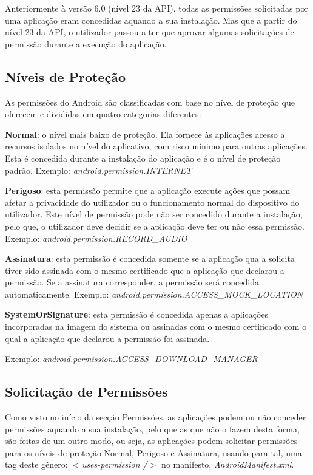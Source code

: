 Anteriormente à versão 6.0 (nível 23 da API), todas as permissões solicitadas por uma aplicação eram concedidas aquando a sua instalação. Mas que a partir do nível 23 da API, o utilizador passou a ter que aprovar algumas solicitações de permissão durante a execução do aplicação.


\subsection{Níveis de Proteção}
As permissões do Android são classificadas com base no nível de proteção que oferecem e divididas em quatro categorias diferentes:

\textbf{Normal}: o nível mais baixo de proteção. Ela fornece às aplicações acesso a recursos isolados no nível do aplicativo, com risco mínimo para outras aplicações. Esta é concedida durante a instalação do aplicação e é o nível de proteção padrão.
Exemplo: \textit{android.permission.INTERNET}

\textbf{Perigoso}: esta permissão permite que a aplicação execute ações que possam afetar a privacidade do utilizador ou o funcionamento normal do dispositivo do utilizador. Este nível de permissão pode não ser concedido durante a instalação, pelo que, o utilizador deve decidir se a aplicação deve ter ou não essa permissão.
Exemplo: \textit{android.permission.RECORD\_AUDIO}

\textbf{Assinatura}: esta permissão é concedida somente se a aplicação qua a solicita tiver sido assinada com o mesmo certificado que a aplicação que declarou a permissão. Se a assinatura corresponder, a permissão será concedida automaticamente.
Exemplo: \textit{android.permission.ACCESS\_MOCK\_LOCATION}

\textbf{SystemOrSignature}: esta permissão é concedida apenas a aplicações incorporadas na imagem do sistema ou assinadas com o mesmo certificado com o qual a aplicação que declarou a permissão foi assinada.
\par Exemplo: \textit{android.permission.ACCESS\_DOWNLOAD\_MANAGER}


\subsection{Solicitação de Permissões}
Como visto no início da secção Permissões, as aplicações podem ou não conceder permissões aquando a sua instalação, pelo que as que não o fazem desta forma, são feitas de um outro modo, ou seja, as aplicações podem solicitar permissões para os níveis de proteção Normal, Perigoso e Assinatura, usando para tal, uma tag deste género: \textit{$<$uses-permission /$>$} no manifesto, \textit{AndroidManifest.xml}.




